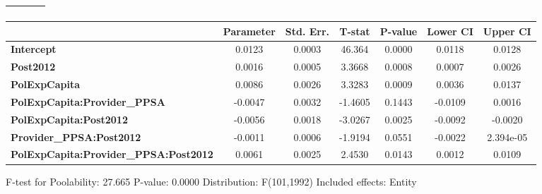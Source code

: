 \begin{center}
\begin{tabular}{lclc}
\textbf{}                                     &                    & \textbf{                     }   &                  \\
\bottomrule
\end{tabular}
\begin{tabular}{lcccccc}
                                              & \textbf{Parameter} & \textbf{Std. Err.} & \textbf{T-stat} & \textbf{P-value} & \textbf{Lower CI} & \textbf{Upper CI}  \\
\midrule
\textbf{Intercept}                            &       0.0123       &       0.0003       &      46.364     &      0.0000      &       0.0118      &       0.0128       \\
\textbf{Post2012}                             &       0.0016       &       0.0005       &      3.3668     &      0.0008      &       0.0007      &       0.0026       \\
\textbf{PolExpCapita}                         &       0.0086       &       0.0026       &      3.3283     &      0.0009      &       0.0036      &       0.0137       \\
\textbf{PolExpCapita:Provider\_PPSA}          &      -0.0047       &       0.0032       &     -1.4605     &      0.1443      &      -0.0109      &       0.0016       \\
\textbf{PolExpCapita:Post2012}                &      -0.0056       &       0.0018       &     -3.0267     &      0.0025      &      -0.0092      &      -0.0020       \\
\textbf{Provider\_PPSA:Post2012}              &      -0.0011       &       0.0006       &     -1.9194     &      0.0551      &      -0.0022      &     2.394e-05      \\
\textbf{PolExpCapita:Provider\_PPSA:Post2012} &       0.0061       &       0.0025       &      2.4530     &      0.0143      &       0.0012      &       0.0109       \\
\bottomrule
\end{tabular}
\end{center}

F-test for Poolability: 27.665 \newline
 P-value: 0.0000 \newline
 Distribution: F(101,1992) \newline
  \newline
 Included effects: Entity